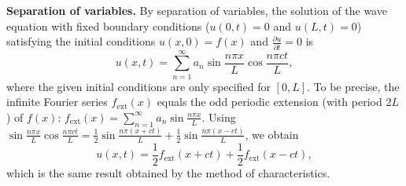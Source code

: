 \textbf{Separation of variables.}  By separation of variables, the solution of the wave equation with fixed boundary conditions ($u(0,t) = 0$ and $u(L,t) = 0$) satisfying the initial conditions $u(x,0) = f(x)$ and $\frac{\partial u}{\partial t} = 0$ is
\[
u(x,t) = \sum_{n=1}^{\infty} a_n \sin\frac{n\pi x}{L}\cos\frac{n\pi ct}{L},
\]
where the given initial conditions are only specified for $[0,L]$.  To be precise, the infinite Fourier series $f_{\text{ext}}(x)$ equals the odd periodic extension (with period $2L$) of $f(x)$: $f_{\text{ext}}(x) = \sum_{n=1}^{\infty} a_n \sin\frac{n\pi x}{L}$.  Using $\sin\frac{n\pi x}{L}\cos\frac{n\pi ct}{L} = \frac{1}{2}\sin\frac{n\pi(x+ct)}{L} + \frac{1}{2}\sin\frac{n\pi(x-ct)}{L}$, we obtain
\[
u(x,t) = \frac{1}{2}f_{\text{ext}}(x + ct) + \frac{1}{2}f_{\text{ext}}(x - ct),
\]
which is the same result obtained by the method of characteristics.


